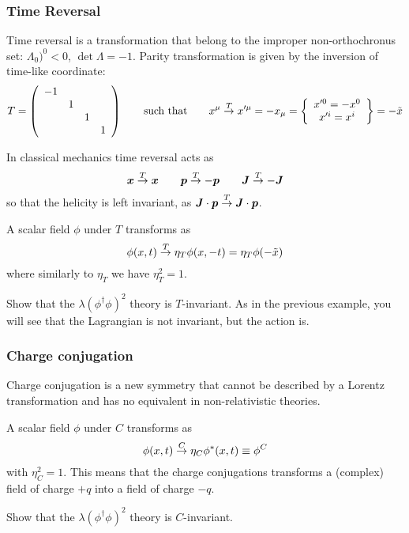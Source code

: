 \documentclass[TheoreticalPhy_ModB.tex]{subfiles}
\begin{document}
\subsubsection{Time Reversal}

Time reversal is a transformation that belong to the{ improper non-orthochronus set}: ${\Lambda_0)}^0<0$, $\det\Lambda=-1$. Parity transformation is given by the inversion of time-like coordinate:
\[T=\left(\begin{array}{cccc}-1 &  &  &  \\ & 1 &  &  \\ &  & 1 &  \\ &  &  & 1\end{array}\right)\qquad\text{such that}\qquad x^\mu\overset{T}{\to} x'^\mu=-x_\mu=\left\{\begin{array}{c}x'^0=-x^0 \\x'^i=x^i\end{array}\right\}=-\tilde x\]

In classical mechanics time reversal acts as 
\[\boldsymbol x\overset{T}{\to}\boldsymbol x\qquad\boldsymbol p\overset{T}{\to}-\boldsymbol p\qquad \boldsymbol J\overset{T}{\to}-\boldsymbol J\]
so that the helicity is left invariant, as $\boldsymbol J\cdot\boldsymbol p\overset{T}{\to}\boldsymbol J\cdot\boldsymbol p$.

A scalar field $\phi$ under $T$ transforms as 
\[\phi(x, t)\overset{T}{\to}\eta_T\phi(x,-t)=\eta_T\phi(-\tilde x)\]
where similarly to $\eta_T$ we have $\eta_T^2=1$. 

\begin{exercise}
Show that the $\lambda(\phi^\dagger\phi)^2$ theory is $T$-invariant. As in the previous example, you will see that the Lagrangian is not invariant, but the action is.
\end{exercise}

\subsubsection{Charge conjugation}

Charge conjugation is a new symmetry that cannot be described by a Lorentz transformation and has no equivalent in non-relativistic theories. 

A scalar field $\phi$ under $C$ transforms as 
\[\phi(x, t)\overset{C}{\to}\eta_C\phi^*(x,t)\equiv \phi^C\]
with $\eta_C^2=1$. This means that the charge conjugations transforms a (complex) field of charge $+q$ into a field of charge $-q$. 

\begin{exercise}
Show that the $\lambda(\phi^\dagger\phi)^2$ theory is $C$-invariant.
\end{exercise}
 
\end{document}
